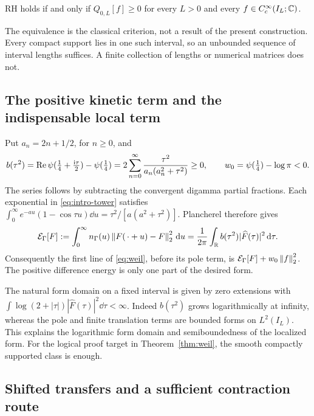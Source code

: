 \begin{theorem}\label{thm:weil}
RH holds if and only if $Q_{0,L}[f]\geq0$ for every $L>0$ and every
$f\in C_c^\infty(I_L;\mathbb C)$.
\end{theorem}
The equivalence is the classical criterion, not a result of the present
construction. Every compact support lies in one such interval, so an
unbounded sequence of interval lengths suffices. A finite collection of
lengths or numerical matrices does not.

\subsection{The positive kinetic term and the indispensable local term}

Put $a_n=2n+1/2$, for $n\geq0$, and
\begin{equation}\label{eq:b-symbol}
 b(\tau^2)=\operatorname{Re}\psi(\tfrac14+\tfrac{\mathrm i\tau}2)-\psi(\tfrac14)
 =2\sum_{n=0}^\infty\frac{\tau^2}{a_n(a_n^2+\tau^2)}\geq0,
 \qquad w_0=\psi(\tfrac14)-\log\pi<0.
\end{equation}
The series follows by subtracting the convergent digamma partial
fractions. Each exponential in \eqref{eq:intro-tower} satisfies
$\int_0^\infty e^{-a u}(1-\cos\tau u)\dd u
=\tau^2/[a(a^2+\tau^2)]$. Plancherel therefore gives
\begin{equation}\label{eq:kinetic}
 \mathcal E_\Gamma[F]
 :=\int_0^\infty n_\Gamma(u)\left\lVert F(\,\cdot+u)-F\right\rVert_2^2\,\mathrm d u
 =\frac1{2\pi}\int_\mathbb R b(\tau^2)|\widehat F(\tau)|^2\,\mathrm d\tau.
\end{equation}
Consequently the first line of \eqref{eq:weil}, before its pole term,
is $\mathcal E_\Gamma[F]+w_0\left\lVert f\right\rVert_2^2$. The positive difference energy
is only one part of the desired form.

The natural form domain on a fixed interval is given by zero extensions
with $\int\log(2+|\tau|)|\widehat F(\tau)|^2\dd\tau<\infty$.
Indeed $b(\tau^2)$ grows logarithmically at infinity, whereas the pole
and finite translation terms are bounded forms on $L^2(I_L)$. This
explains the logarithmic form domain and semiboundedness of the
localized form. For the logical proof target in Theorem~\ref{thm:weil},
the smooth compactly supported class is enough.

\subsection{Shifted transfers and a sufficient contraction route}

